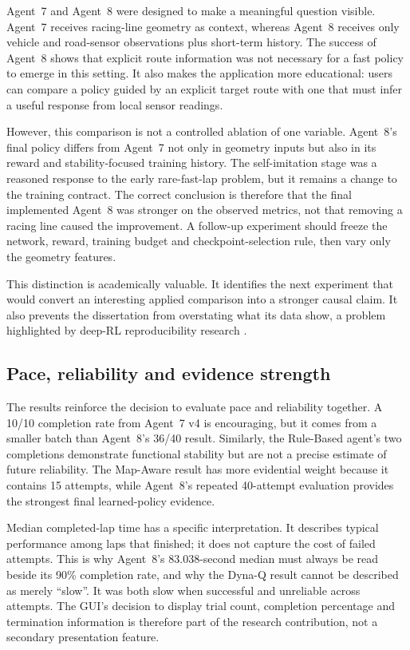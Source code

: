 Agent~7 and Agent~8 were designed to make a meaningful question visible. Agent~7 receives racing-line geometry as context, whereas Agent~8 receives only vehicle and road-sensor observations plus short-term history. The success of Agent~8 shows that explicit route information was not necessary for a fast policy to emerge in this setting. It also makes the application more educational: users can compare a policy guided by an explicit target route with one that must infer a useful response from local sensor readings.

However, this comparison is not a controlled ablation of one variable. Agent~8's final policy differs from Agent~7 not only in geometry inputs but also in its reward and stability-focused training history. The self-imitation stage was a reasoned response to the early rare-fast-lap problem, but it remains a change to the training contract. The correct conclusion is therefore that the final implemented Agent~8 was stronger on the observed metrics, not that removing a racing line caused the improvement. A follow-up experiment should freeze the network, reward, training budget and checkpoint-selection rule, then vary only the geometry features.

This distinction is academically valuable. It identifies the next experiment that would convert an interesting applied comparison into a stronger causal claim. It also prevents the dissertation from overstating what its data show, a problem highlighted by deep-RL reproducibility research \parencite{henderson2018,agarwal2021}.

\subsection{Pace, reliability and evidence strength}

The results reinforce the decision to evaluate pace and reliability together. A 10/10 completion rate from Agent~7 v4 is encouraging, but it comes from a smaller batch than Agent~8's 36/40 result. Similarly, the Rule-Based agent's two completions demonstrate functional stability but are not a precise estimate of future reliability. The Map-Aware result has more evidential weight because it contains 15 attempts, while Agent~8's repeated 40-attempt evaluation provides the strongest final learned-policy evidence.

Median completed-lap time has a specific interpretation. It describes typical performance among laps that finished; it does not capture the cost of failed attempts. This is why Agent~8's 83.038-second median must always be read beside its 90\% completion rate, and why the Dyna-Q result cannot be described as merely \enquote{slow}. It was both slow when successful and unreliable across attempts. The GUI's decision to display trial count, completion percentage and termination information is therefore part of the research contribution, not a secondary presentation feature.

